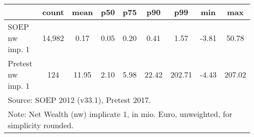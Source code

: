{
\def\sym#1{\ifmmode^{#1}\else\(^{#1}\)\fi}
\begin{tabular}{l*{1}{cccccccc}}
\hline\hline
                                            &       count&        mean&         p50&         p75&         p90&         p99&         min&         max\\
\hline
SOEP nw imp. 1                              &      14,982&        0.17&        0.05&        0.20&        0.41&        1.57&       -3.81&       50.78\\
Pretest nw imp. 1                           &         124&       11.95&        2.10&        5.98&       22.42&      202.71&       -4.43&      207.02\\
\hline\hline
\multicolumn{9}{l}{\footnotesize Source: SOEP 2012 (v33.1), Pretest 2017.}\\
\multicolumn{9}{l}{\footnotesize Note: Net Wealth (nw) implicate 1, in mio. Euro, unweighted, for simplicity rounded.}\\
\end{tabular}
}
